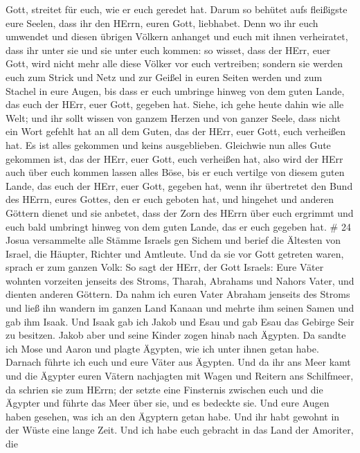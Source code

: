 Gott, streitet für euch, wie er euch geredet hat.  Darum so
behütet aufs fleißigste eure Seelen, dass ihr den HErrn, euren Gott,
liebhabet.  Denn wo ihr euch umwendet und diesen übrigen
Völkern anhanget und euch mit ihnen verheiratet, dass ihr unter sie und
sie unter euch kommen:  so wisset, dass der HErr, euer
Gott, wird nicht mehr alle diese Völker vor euch vertreiben; sondern sie
werden euch zum Strick und Netz und zur Geißel in euren Seiten werden
und zum Stachel in eure Augen, bis dass er euch umbringe hinweg von dem
guten Lande, das euch der HErr, euer Gott, gegeben hat. 
Siehe, ich gehe heute dahin wie alle Welt; und ihr sollt wissen von
ganzem Herzen und von ganzer Seele, dass nicht ein Wort gefehlt hat an
all dem Guten, das der HErr, euer Gott, euch verheißen hat. Es ist alles
gekommen und keins ausgeblieben.  Gleichwie nun alles Gute
gekommen ist, das der HErr, euer Gott, euch verheißen hat, also wird der
HErr auch über euch kommen lassen alles Böse, bis er euch vertilge von
diesem guten Lande, das euch der HErr, euer Gott, gegeben hat,
 wenn ihr übertretet den Bund des HErrn, eures Gottes, den
er euch geboten hat, und hingehet und anderen Göttern dienet und sie
anbetet, dass der Zorn des HErrn über euch ergrimmt und euch bald
umbringt hinweg von dem guten Lande, das er euch gegeben hat. \# 24
 Josua versammelte alle Stämme Israels gen Sichem und berief
die Ältesten von Israel, die Häupter, Richter und Amtleute. Und da sie
vor Gott getreten waren,  sprach er zum ganzen Volk: So sagt
der HErr, der Gott Israels: Eure Väter wohnten vorzeiten jenseits des
Stroms, Tharah, Abrahams und Nahors Vater, und dienten anderen Göttern.
 Da nahm ich euren Vater Abraham jenseits des Stroms und
ließ ihn wandern im ganzen Land Kanaan und mehrte ihm seinen Samen und
gab ihm Isaak.  Und Isaak gab ich Jakob und Esau und gab
Esau das Gebirge Seir zu besitzen. Jakob aber und seine Kinder zogen
hinab nach Ägypten.  Da sandte ich Mose und Aaron und plagte
Ägypten, wie ich unter ihnen getan habe.  Darnach führte ich
euch und eure Väter aus Ägypten. Und da ihr ans Meer kamt und die
Ägypter euren Vätern nachjagten mit Wagen und Reitern ans Schilfmeer,
 da schrien sie zum HErrn; der setzte eine Finsternis
zwischen euch und die Ägypter und führte das Meer über sie, und es
bedeckte sie. Und eure Augen haben gesehen, was ich an den Ägyptern
getan habe. Und ihr habt gewohnt in der Wüste eine lange Zeit.
 Und ich habe euch gebracht in das Land der Amoriter, die
